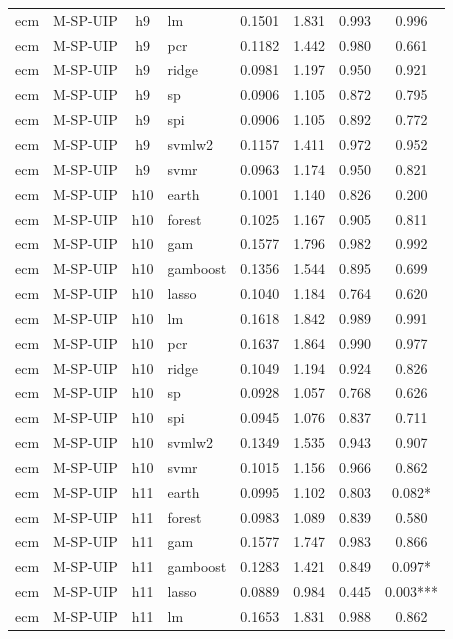 \begin{ThreePartTable}
\begin{longtable}[t]{llclcccc}
ecm & M-SP-UIP & h9 & lm & 0.1501 & 1.831 & 0.993 & 0.996\\
ecm & M-SP-UIP & h9 & pcr & 0.1182 & 1.442 & 0.980 & 0.661\\
ecm & M-SP-UIP & h9 & ridge & 0.0981 & 1.197 & 0.950 & 0.921\\
ecm & M-SP-UIP & h9 & sp & 0.0906 & 1.105 & 0.872 & 0.795\\
ecm & M-SP-UIP & h9 & spi & 0.0906 & 1.105 & 0.892 & 0.772\\
ecm & M-SP-UIP & h9 & svmlw2 & 0.1157 & 1.411 & 0.972 & 0.952\\
ecm & M-SP-UIP & h9 & svmr & 0.0963 & 1.174 & 0.950 & 0.821\\
\addlinespace
ecm & M-SP-UIP & h10 & earth & 0.1001 & 1.140 & 0.826 & 0.200\\
ecm & M-SP-UIP & h10 & forest & 0.1025 & 1.167 & 0.905 & 0.811\\
ecm & M-SP-UIP & h10 & gam & 0.1577 & 1.796 & 0.982 & 0.992\\
ecm & M-SP-UIP & h10 & gamboost & 0.1356 & 1.544 & 0.895 & 0.699\\
ecm & M-SP-UIP & h10 & lasso & 0.1040 & 1.184 & 0.764 & 0.620\\
ecm & M-SP-UIP & h10 & lm & 0.1618 & 1.842 & 0.989 & 0.991\\
ecm & M-SP-UIP & h10 & pcr & 0.1637 & 1.864 & 0.990 & 0.977\\
ecm & M-SP-UIP & h10 & ridge & 0.1049 & 1.194 & 0.924 & 0.826\\
ecm & M-SP-UIP & h10 & sp & 0.0928 & 1.057 & 0.768 & 0.626\\
ecm & M-SP-UIP & h10 & spi & 0.0945 & 1.076 & 0.837 & 0.711\\
ecm & M-SP-UIP & h10 & svmlw2 & 0.1349 & 1.535 & 0.943 & 0.907\\
ecm & M-SP-UIP & h10 & svmr & 0.1015 & 1.156 & 0.966 & 0.862\\
\addlinespace
ecm & M-SP-UIP & h11 & earth & 0.0995 & 1.102 & 0.803 & 0.082*\\
ecm & M-SP-UIP & h11 & forest & 0.0983 & 1.089 & 0.839 & 0.580\\
ecm & M-SP-UIP & h11 & gam & 0.1577 & 1.747 & 0.983 & 0.866\\
ecm & M-SP-UIP & h11 & gamboost & 0.1283 & 1.421 & 0.849 & 0.097*\\
ecm & M-SP-UIP & h11 & lasso & 0.0889 & 0.984 & 0.445 & 0.003***\\
ecm & M-SP-UIP & h11 & lm & 0.1653 & 1.831 & 0.988 & 0.862\\

\end{longtable}
\end{ThreePartTable}
